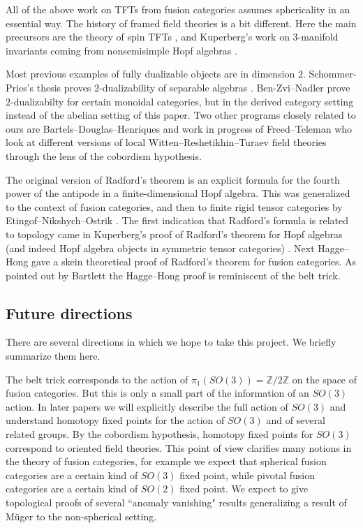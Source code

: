 \documentclass{amsart}
\begin{document}
All of the above work on TFTs from fusion categories assumes sphericality in an essential way.  The history of framed field theories is a bit different.  Here the main precursors are the theory of spin TFTs \cite{MR1117149, MR1171303, MR1387228, MR1880321}, and Kuperberg's work on $3$-manifold invariants coming from nonsemisimple Hopf algebras \cite{MR1394749}.

Most previous examples of fully dualizable objects are in dimension $2$.  Schommer-Pries's thesis proves $2$-dualizability of separable algebras \cite{schommer-pries-thesis}.    Ben-Zvi--Nadler \cite{0904.1247} prove $2$-dualizabilty for certain monoidal categories, but in the derived category setting instead of the abelian setting of this paper.   Two other programs closely related to ours are Bartels--Douglas--Henriques \cite{0912.5307} and work in progress of Freed--Teleman who look at different versions of local Witten--Reshetikhin--Turaev field theories \cite{MR990772, MR1091619} through the lens of the cobordism hypothesis. 

The original version of Radford's theorem \cite{MR0407069} is an explicit formula for the fourth power of the antipode in a finite-dimensional Hopf algebra.  This was generalized to the context of fusion categories, and then to finite rigid tensor categories by Etingof--Nikshych--Ostrik \cite{MR2183279,MR2097289}.  The first indication that Radford's formula is related to topology came in Kuperberg's proof of Radford's theorem for Hopf algebras (and indeed Hopf algebra objects in symmetric tensor categories) \cite{MR1394749}.  Next Hagge--Hong \cite{MR2559711} gave a skein theoretical proof of Radford's theorem for fusion categories.  As pointed out by Bartlett \cite{0901.3975} the Hagge--Hong proof is reminiscent of the belt trick.

\subsection*{Future directions}

There are several directions in which we hope to take this project. We briefly summarize them here.

The belt trick corresponds to the action of $\pi_1(SO(3)) = \mathbb{Z}/2\mathbb{Z}$ on the space of fusion categories.  But this is only a small part of the information of an $SO(3)$ action.  In later papers we will explicitly describe the full action of $SO(3)$ and understand homotopy fixed points for the action of $SO(3)$ and of several related groups.  By the cobordism hypothesis, homotopy fixed points for $SO(3)$ correspond to oriented field theories.  This point of view clarifies many notions in the theory of fusion categories, for example we expect that spherical fusion categories are a certain kind of $SO(3)$ fixed point, while pivotal fusion categories are a certain kind of $SO(2)$ fixed point.  We expect to give topological proofs of several ``anomaly vanishing" results generalizing a result of M\"uger \cite{MR1966525} to the non-spherical setting.  
\end{document}

